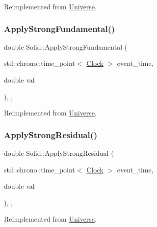 Reimplemented from \mbox{\hyperlink{classUniverse_a906a88b37f10bfa630bef49dfd0e907a}{Universe}}.

\mbox{\label{classSolid_abd8fff76385306f97aa65dfd6b867fc6}} 
\subsubsection{\texorpdfstring{Apply\+Strong\+Fundamental()}{ApplyStrongFundamental()}}
{\footnotesize\ttfamily double Solid\+::\+Apply\+Strong\+Fundamental (\begin{DoxyParamCaption}\item[{std\+::chrono\+::time\+\_\+point$<$ \mbox{\hyperlink{universe_8h_a0ef8d951d1ca5ab3cfaf7ab4c7a6fd80}{Clock}} $>$}]{event\+\_\+time,  }\item[{double}]{val }\end{DoxyParamCaption})\hspace{0.3cm}{\ttfamily [inline]}, {\ttfamily [final]}, {\ttfamily [virtual]}}



Reimplemented from \mbox{\hyperlink{classUniverse_a62789bcff84bd750b0366004381e2fdd}{Universe}}.

\mbox{\label{classSolid_a07534fa79bb8a6eb32e081e5158ba9e5}} 
\subsubsection{\texorpdfstring{Apply\+Strong\+Residual()}{ApplyStrongResidual()}}
{\footnotesize\ttfamily double Solid\+::\+Apply\+Strong\+Residual (\begin{DoxyParamCaption}\item[{std\+::chrono\+::time\+\_\+point$<$ \mbox{\hyperlink{universe_8h_a0ef8d951d1ca5ab3cfaf7ab4c7a6fd80}{Clock}} $>$}]{event\+\_\+time,  }\item[{double}]{val }\end{DoxyParamCaption})\hspace{0.3cm}{\ttfamily [inline]}, {\ttfamily [final]}, {\ttfamily [virtual]}}



Reimplemented from \mbox{\hyperlink{classUniverse_af7becebb347be9a85541d96a3eca1ca7}{Universe}}.

